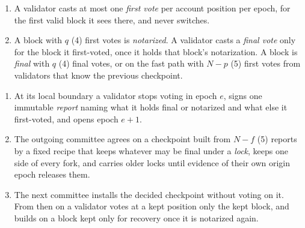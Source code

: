 \begin{enumerate}[label=\rulename{R\arabic*},ref=R\arabic*]
\item\label{r:one} A validator casts at most one \emph{first vote} per account position per epoch, for the first valid block it sees there, and never switches.
\item\label{r:final} A block with $q$ (4) first votes is \emph{notarized}. A validator casts a \emph{final vote} only for the block it first-voted, once it holds that block's notarization. A block is \emph{final} with $q$ (4) final votes, or on the fast path with $N-p$ (5) first votes from validators that know the previous checkpoint.
\end{enumerate}
\begin{enumerate}[resume,label=\rulename{R\arabic*},ref=R\arabic*]
\item\label{r:report} At its local boundary a validator stops voting in epoch $e$, signs one immutable \emph{report} naming what it holds final or notarized and what else it first-voted, and opens epoch $e+1$.
\item\label{r:build} The outgoing committee agrees on a checkpoint built from $N-f$ (5) reports by a fixed recipe that keeps whatever may be final under a \emph{lock}, keeps one side of every fork, and carries older locks until evidence of their own origin epoch releases them.
\item\label{r:install} The next committee installs the decided checkpoint without voting on it. From then on a validator votes at a kept position only the kept block, and builds on a block kept only for recovery once it is notarized again.
\end{enumerate}

